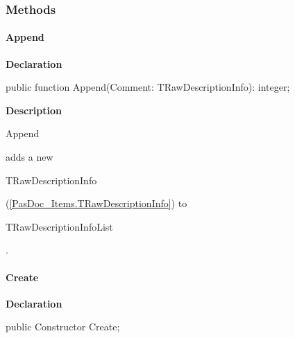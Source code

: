 \documentclass{report}
\newif\ifpdf
\begin{document}
\subsubsection*{\large{\textbf{Methods}}\normalsize\hspace{1ex}\hfill}
\paragraph*{Append}\hspace*{\fill}

\label{PasDoc_Parser.TRawDescriptionInfoList-Append}
\begin{list}{}{
\setlength{\itemindent}{0cm}
\setlength{\listparindent}{0cm}
\setlength{\leftmargin}{\evensidemargin}
\addtolength{\leftmargin}{\tmplength}
\settowidth{\labelsep}{X}
\addtolength{\leftmargin}{\labelsep}
\setlength{\labelwidth}{\tmplength}
}
\item[\textbf{Declaration}\hfill]
\ifpdf
\begin{flushleft}
\fi
\begin{ttfamily}
public function Append(Comment: TRawDescriptionInfo): integer;\end{ttfamily}

\ifpdf
\end{flushleft}
\fi

\par
\item[\textbf{Description}]
\begin{ttfamily}Append\end{ttfamily} adds a new \begin{ttfamily}TRawDescriptionInfo\end{ttfamily}(\ref{PasDoc_Items.TRawDescriptionInfo}) to \begin{ttfamily}TRawDescriptionInfoList\end{ttfamily}.

\end{list}
\paragraph*{Create}\hspace*{\fill}

\label{PasDoc_Parser.TRawDescriptionInfoList-Create}
\begin{list}{}{
\setlength{\itemindent}{0cm}
\setlength{\listparindent}{0cm}
\setlength{\leftmargin}{\evensidemargin}
\addtolength{\leftmargin}{\tmplength}
\settowidth{\labelsep}{X}
\addtolength{\leftmargin}{\labelsep}
\setlength{\labelwidth}{\tmplength}
}
\item[\textbf{Declaration}\hfill]
\ifpdf
\begin{flushleft}
\fi
\begin{ttfamily}
public Constructor Create;\end{ttfamily}

\ifpdf
\end{flushleft}
\fi

\end{list}
\ifpdf
\end{document}
